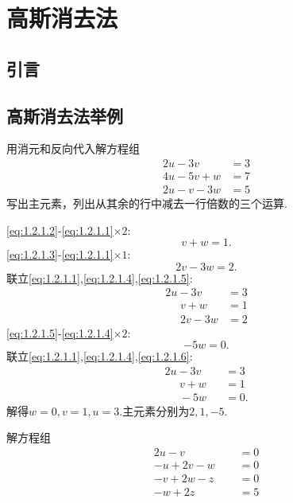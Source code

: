 ﻿\documentclass{book} \usepackage{exsheets} \usepackage{xeCJK}
\begin{document}
\chapter{高斯消去法}
\section{引言}
\section{高斯消去法举例}
\begin{question}
  用消元和反向代入解方程组
  \begin{align}
    2u-3v~~~~~~&=3\tag{1}\label{eq:1.2.1.1}\\
    4u-5v+w&=7\tag{2}\label{eq:1.2.1.2}\\
2u-v-3w&=5\tag{3}\label{eq:1.2.1.3}
  \end{align}
写出主元素，列出从其余的行中减去一行倍数的三个运算.
\end{question}
\begin{solution}
  \eqref{eq:1.2.1.2}-\eqref{eq:1.2.1.1}$\times 2$:
  \begin{equation}\tag{4}
    \label{eq:1.2.1.4}
    v+w=1.
  \end{equation}
\eqref{eq:1.2.1.3}-\eqref{eq:1.2.1.1}$\times 1$:
\begin{equation}\tag{5}
  \label{eq:1.2.1.5}
  2v-3w=2.
\end{equation}
联立\eqref{eq:1.2.1.1},\eqref{eq:1.2.1.4},\eqref{eq:1.2.1.5}:
\begin{align*}
  2u-3v~~~~~~&=3\\
~~~~~~v+w&=1\\
~~~~~~2v-3w&=2
\end{align*}
\eqref{eq:1.2.1.5}-\eqref{eq:1.2.1.4}$\times 2$:
\begin{equation}\tag{6}
  \label{eq:1.2.1.6}
  -5w=0.
\end{equation}
联立\eqref{eq:1.2.1.1},\eqref{eq:1.2.1.4},\eqref{eq:1.2.1.6}:
\begin{align*}
  2u-3v~~~~~~&=3\\
~~~~~~v+w&=1\\
~~~~~~-5w&=0.
\end{align*}
解得$w=0,v=1,u=3$.主元素分别为$2,1,-5$.
\end{solution}
\begin{question}
  解方程组
  \begin{align}
    2u-v~~~~~~~~~~~~&=0\tag{1}\label{eq:1.2.2.1}\\
-u+2v-w~~~~~~&=0\tag{2}\label{eq:1.2.2.2}\\
-v+2w-z&=0\tag{3}\label{eq:1.2.2.3}\\
-w+2z&=5\tag{4}\label{eq:1.2.2.4}
  \end{align}
\end{question}
\end{document}
